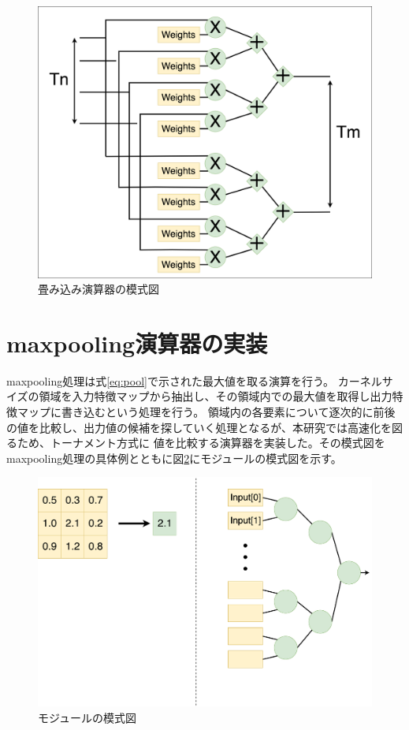{\begin{figure}[h]
    \centering
    \includegraphics[width=12cm]{./chap6/fig/ucla_pe.png}
    \caption{畳み込み演算器の模式図}
    \label{fig:conv_pe}
\end{figure}

\section{maxpooling演算器の実装}
\label{sec:max_impl}
maxpooling処理は式\ref{eq:pool}で示された最大値を取る演算を行う。
カーネルサイズの領域を入力特徴マップから抽出し、その領域内での最大値を取得し出力特徴マップに書き込むという処理を行う。
領域内の各要素について逐次的に前後の値を比較し、出力値の候補を探していく処理となるが、本研究では高速化を図るため、トーナメント方式に
値を比較する演算器を実装した。その模式図をmaxpooling処理の具体例とともに図\ref{fig:maxpool_pe}にモジュールの模式図を示す。
\begin{figure}[h]
  \centering
  \includegraphics[width=12cm]{./chap6/fig/maxpool_pe.pdf}
  \caption{モジュールの模式図}
  \label{fig:maxpool_pe}
\end{figure}
}


